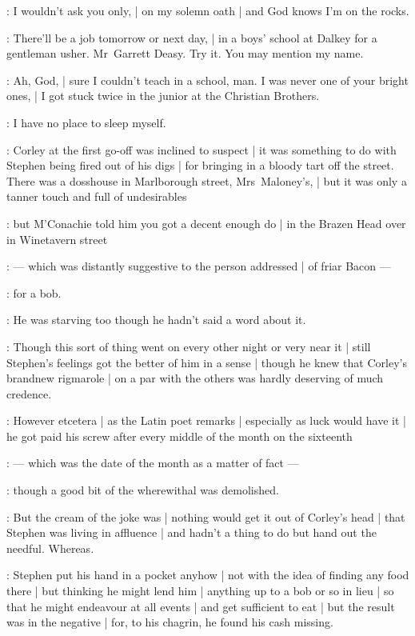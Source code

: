 \LordJohnCorley:
I wouldn't ask you only, |
on my solemn oath |
and God knows I'm on the rocks.

\Stephen:
There'll be a job tomorrow or next day, |
in a boys' school at Dalkey for a gentleman usher.
Mr~Garrett Deasy.
Try it.
You may mention my name.

\LordJohnCorley:
Ah, God, |
sure I couldn't teach in a school, man.
I was never one of your bright ones, |
I got stuck twice in the junior at the Christian Brothers.

\Stephen:
I have no place to sleep myself.

:
Corley at the first go-off was inclined to suspect |
it was something to do with Stephen being fired out of his digs |
for bringing in a bloody tart off the street.
There was a dosshouse in Marlborough street, Mrs~Maloney's, |
but it was only a tanner touch and full of undesirables

:
but M'Conachie told him you got a decent enough do |
in the Brazen Head over in Winetavern street

:
    --- which was distantly suggestive to the person addressed |
        of friar Bacon ---

:
for a bob.

:
He was starving too though he hadn't said a word about it.

:
Though this sort of thing went on every other night or very near it |
still Stephen's feelings got the better of him in a sense |
though he knew that Corley's brandnew rigmarole |
on a par with the others was hardly deserving of much credence.

:
However  etcetera |
as the Latin poet remarks |
especially as luck would have it |
he got paid his screw after every middle of the month on the sixteenth

:
    --- which was the date of the month as a matter of fact ---

:
though a good bit of the wherewithal was demolished.

:
But the cream of the joke was |
nothing would get it out of Corley's head |
that Stephen was living in affluence |
and hadn't a thing to do but hand out the needful.
Whereas.

:
Stephen put his hand in a pocket anyhow |
not with the idea of finding any food there |
but thinking he might lend him |
anything up to a bob or so in lieu |
so that he might endeavour at all events |
and get sufficient to eat |
but the result was in the negative |
for, to his chagrin, he found his cash missing.

